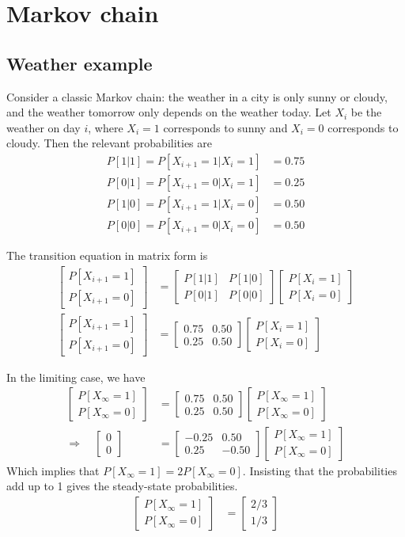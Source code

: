 \documentclass[twocolumn]{myarticle}
\newcommand{\mat}[1]{\begin{bmatrix}#1\end{bmatrix}}
\begin{document}
\section{Markov chain}
\label{sec:markov_chain}

\subsection{Weather example}
\label{subsec:weather_example}

Consider a classic Markov chain: the weather in a city is only sunny or cloudy, and the weather tomorrow only depends on the weather today.
Let $ X_i $ be the weather on day $ i $, where $ X_i = 1 $ corresponds to sunny and $ X_i = 0 $ corresponds to cloudy.
Then the relevant probabilities are
\begin{align}
    P[1|1] = P[X_{i+1} = 1 | X_{i} = 1] &= 0.75
    \\
    P[0|1] = P[X_{i+1} = 0 | X_{i} = 1] &= 0.25
    \\
    P[1|0] = P[X_{i+1} = 1 | X_{i} = 0] &= 0.50
    \\
    P[0|0] = P[X_{i+1} = 0 | X_{i} = 0] &= 0.50
\end{align}

The transition equation in matrix form is
\begin{align}
    \mat{P[X_{i+1} = 1] \\ P[X_{i+1} = 0]} &= \mat{P[1|1] & P[1|0] \\ P[0|1] & P[0|0]} \mat{P[X_{i} = 1] \\ P[X_{i} = 0]}
    \\
    \mat{P[X_{i+1} = 1] \\ P[X_{i+1} = 0]} &= \mat{0.75 & 0.50 \\ 0.25 & 0.50} \mat{P[X_{i} = 1] \\ P[X_{i} = 0]}
\end{align}

In the limiting case, we have
\begin{align}
    \mat{P[X_\infty = 1] \\ P[X_\infty = 0]} &= \mat{0.75 & 0.50 \\ 0.25 & 0.50} \mat{P[X_\infty = 1] \\ P[X_\infty = 0]}
    \\
    \Longrightarrow \quad \mat{0 \\ 0} &= \mat{-0.25 & 0.50 \\ 0.25 & -0.50} \mat{P[X_\infty = 1] \\ P[X_\infty = 0]}
\end{align}
Which implies that $ P[X_\infty = 1] = 2 P[X_\infty = 0] $.
Insisting that the probabilities add up to 1 gives the steady-state probabilities.
\begin{align}
    \mat{P[X_\infty = 1] \\ P[X_\infty = 0]} &= \mat{2/3 \\ 1/3}
\end{align}
\end{document}
